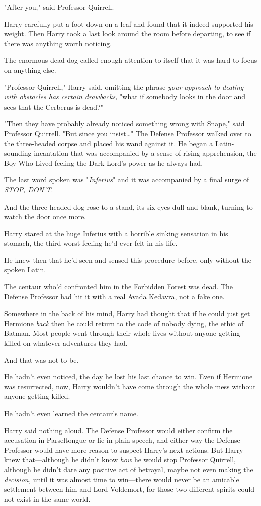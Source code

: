 "After you," said Professor Quirrell.

Harry carefully put a foot down on a leaf and found that it indeed supported
his weight. Then Harry took a last look around the room before departing, to
see if there was anything worth noticing.

The enormous dead dog called enough attention to itself that it was hard to
focus on anything else.

"Professor Quirrell," Harry said, omitting the phrase \emph{your approach to
dealing with obstacles has certain drawbacks,} "what if somebody looks in the
door and sees that the Cerberus is dead?"

"Then they have probably already noticed something wrong with Snape," said
Professor Quirrell. "But since you insist{\ldots}" The Defense Professor walked
over to the three-headed corpse and placed his wand against it. He began a
Latin-sounding incantation that was accompanied by a sense of rising
apprehension, the Boy-Who-Lived feeling the Dark Lord's power as he always had.

The last word spoken was "\emph{Inferius}" and it was accompanied by a final
surge of \emph{STOP, DON'T}.

And the three-headed dog rose to a stand, its six eyes dull and blank, turning
to watch the door once more.

Harry stared at the huge Inferius with a horrible sinking sensation in his
stomach, the third-worst feeling he'd ever felt in his life.

He knew then that he'd seen and sensed this procedure before, only without the
spoken Latin.

The centaur who'd confronted him in the Forbidden Forest was dead. The Defense
Professor had hit it with a real Avada Kedavra, not a fake one.

Somewhere in the back of his mind, Harry had thought that if he could just get
Hermione \emph{back} then he could return to the code of nobody dying, the
ethic of Batman. Most people went through their whole lives without anyone
getting killed on whatever adventures they had.

And that was not to be.

He hadn't even noticed, the day he lost his last chance to win. Even if
Hermione was resurrected, now, Harry wouldn't have come through the whole mess
without anyone getting killed.

He hadn't even learned the centaur's name.

Harry said nothing aloud. The Defense Professor would either confirm the
accusation in Parseltongue or lie in plain speech, and either way the Defense
Professor would have more reason to suspect Harry's next actions. But Harry
knew that---although he didn't know \emph{how} he would stop Professor
Quirrell, although he didn't dare any positive act of betrayal, maybe not even
making the \emph{decision,} until it was almost time to win---there would never
be an amicable settlement between him and Lord Voldemort, for those two
different spirits could not exist in the same world.

